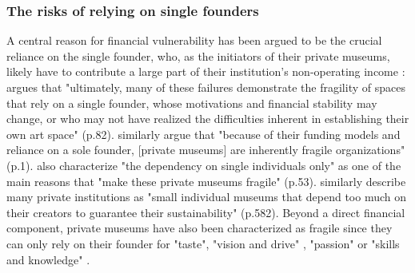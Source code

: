 \documentclass[12pt]{article}
\begin{document}
\subsubsection*{The risks of relying on single founders}




A central reason for financial vulnerability has been argued to be the crucial reliance on the single founder, who, as the initiators of their private museums, likely have to contribute a large part of their institution's non-operating income \parencite{Frey_Meier_2002_beyeler}:
\textcite{Adam_2021_rise} argues that "ultimately, many of these failures demonstrate the fragility of spaces that rely on a single founder, whose motivations and financial stability may change, or who may not have realized the difficulties inherent in establishing their own art space" (p.82).
\textcite{Velthuis_Gera_2024_fragility} similarly argue that "because of their funding models and reliance on a sole founder, [private museums] are inherently fragile organizations" (p.1).
\textcite{Bechtler_Imhof_2018_future} also characterize "the dependency on single individuals only" as one of the main reasons that "make these private museums fragile" (p.53).
\textcite{StylianouLambert_etal_2014_museums} similarly describe many private institutions as "small individual museums that depend too much on their creators to guarantee their sustainability" (p.582).
Beyond a direct financial component, private museums have also been characterized as fragile since they can only rely on their founder for "taste", "vision and drive" \parencite[p.77]{Adam_2021_rise}, "passion" \parencite[p.234]{Walker_2019_collector} or "skills and knowledge" \parencite[p.580]{StylianouLambert_etal_2014_museums}.
\end{document}
